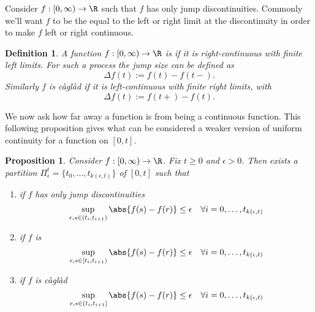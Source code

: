 \documentclass{scrreprt}
\theoremstyle{mydefn}
\newtheorem{defn}{Definition}
\newtheorem{prop}{Proposition}
\theoremstyle{remark}
\newcommand{\caglad}{c\`agl\`ad}
\newcommand\defeq{:=}
\begin{document}
Consider $f: [0, \infty) \to \R$ such that $f$ has only jump discontinuities. Commonly we'll want $f$ to be the equal to the left or right limit at the discontinuity in order to make $f$ left or right continuous.

\begin{defn}
	A function $f: [0, \infty) \to \R$ is \emph{\cadlag{}} if it is right-continuous with finite left limits. For such a process the \emph{jump size} can be defined as
	\begin{equation}
		\Delta f(t) \defeq f(t) - f(t-).
	\end{equation}
	Similarly $f$ is \emph{c\`agl\`ad} if it is left-continuous with finite right limits, with
	\begin{equation}
		\Delta f(t) \defeq f(t+) - f(t).
	\end{equation}
\end{defn}

We now ask how far away a \cadlag{} function is from being a continuous function. This following proposition gives what can be considered a weaker version of uniform continuity for a \cadlag{} function on $[0, t]$.

\begin{prop}
	\label{prop:jump-mesh}
	Consider $f: [0, \infty) \to \R$. Fix $t \geq 0$ and $\epsilon > 0$. Then exists a partition $\Pi_{\epsilon}^t = \{t_0, \ldots, t_{k(\epsilon, t)}\}$ of $[0, t]$ such that
	\begin{enumerate}
		\item if $f$ has only jump discontinuities
			\begin{equation}
				\label{eq:part-condition}
				\sup_{r, s \in (t_i, t_{i+1})} \abs{f(s) - f(r)} \leq \epsilon
				\quad \forall i = 0, \ldots, t_{k(\epsilon, t)}
			\end{equation}
		\item if $f$ is \cadlag{}
			\begin{equation}
				\sup_{r, s \in [t_i, t_{i+1})} \abs{f(s) - f(r)} \leq \epsilon
				\quad \forall i = 0, \ldots, t_{k(\epsilon, t)}
			\end{equation}
		\item if $f$ is \caglad{}
			\begin{equation}
				\sup_{r, s \in (t_i, t_{i+1}]} \abs{f(s) - f(r)} \leq \epsilon
				\quad \forall i = 0, \ldots, t_{k(\epsilon, t)}
			\end{equation}
	\end{enumerate}
\end{prop}
\end{document}
